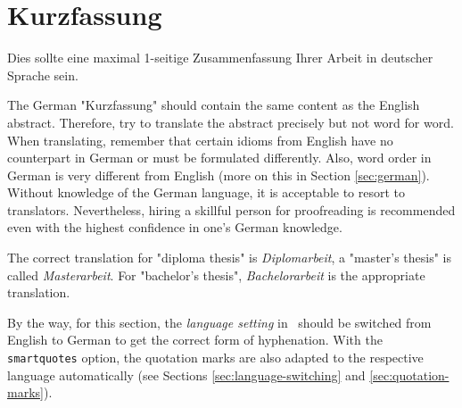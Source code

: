 \chapter{Kurzfassung}

\begin{german} %
	Dies sollte eine maximal 1-seitige Zusammenfassung Ihrer Arbeit in deutscher
	Sprache sein.
\end{german}

The German "Kurzfassung" should contain the same content as the English abstract.
Therefore, try to translate the abstract precisely but not word for word. When
translating, remember that certain idioms from English have no counterpart in
German or must be formulated differently. Also, word order in German is very
different from English (more on this in Section \ref{sec:german}). Without
knowledge of the German language, it is acceptable to resort to translators.
Nevertheless, hiring a skillful person for proofreading is recommended
even with the highest confidence in one's German knowledge.

The correct translation for "diploma thesis" is \emph{Diplomarbeit}, a
"master's thesis" is called \emph{Masterarbeit}. For "bachelor's thesis",
\emph{Bachelorarbeit} is the appropriate translation.

By the way, for this section, the \emph{language setting} in \latex\ should be
switched from English to German to get the correct form of hyphenation. With
the \texttt{smartquotes} option, the quotation marks are also adapted to the
respective language automatically (see Sections \ref{sec:language-switching}
and \ref{sec:quotation-marks}).
